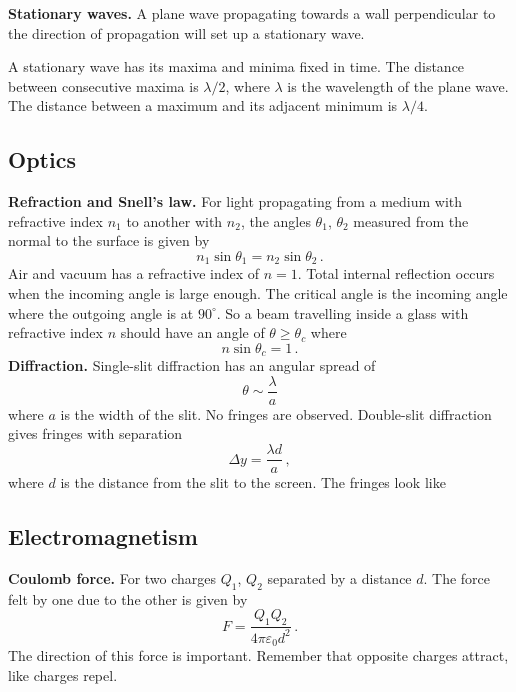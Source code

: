 \documentclass{article}
\begin{document}
\textbf{Stationary waves.} A plane wave propagating towards a wall perpendicular to the direction of propagation will set up a stationary wave.

A stationary wave has its maxima and minima fixed in time. The distance between consecutive maxima is $\lambda/2$, where $\lambda$ is the wavelength of the plane wave. The distance between a maximum and its adjacent minimum is $\lambda/4$.

\subsection{Optics}
\textbf{Refraction and Snell's law.} For light propagating from a medium with refractive index $n_1$ to another with $n_2$, the angles $\theta_1$, $\theta_2$ measured from the normal to the surface is given by
\[
n_1\sin\theta_1=n_2\sin\theta_2\,.
\]
Air and vacuum has a refractive index of $n=1$.
Total internal reflection occurs when the incoming angle is large enough. The critical angle is the incoming angle where the outgoing angle is at $90^\circ$. So a beam travelling inside a glass with refractive index $n$ should have an angle of $\theta\geq\theta_c$ where
\[
n\sin\theta_c=1\,.
\]
\textbf{Diffraction.} Single-slit diffraction has an angular spread of
\[
\theta\sim\frac{\lambda}{a}
\]
where $a$ is the width of the slit. No fringes are observed.
Double-slit diffraction gives fringes with separation 
\[
\Delta y=\frac{\lambda d}{a}\,,
\]
where $d$ is the distance from the slit to the screen. The fringes look like
\begin{figure}[H]
\centering
{}
\end{figure}

\subsection{Electromagnetism}

\textbf{Coulomb force.} For two charges $Q_1$, $Q_2$ separated by a distance $d$. The force felt by one due to the other is given by
\[
F=\frac{Q_1Q_2}{4\pi\varepsilon_0d^2}\,.
\]
The direction of this force is important. Remember that opposite charges attract, like charges repel.
\end{document}
